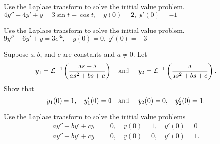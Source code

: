 \documentclass{ximera}
\begin{document}
\begin{problem}\label{exer:8.3.36} Use the Laplace transform to solve the initial value problem. $4y''+4y'+y=3\sin t+\cos t, \quad   y(0)=2,\;  y'(0)=-1$
\end{problem}

\begin{problem}\label{exer:8.3.37} Use the Laplace transform to solve the initial value problem. $9y''+6y'+y=3e^{3t}, \quad   y(0)=0,\;  y'(0)=-3$
\end{problem}

\begin{problem}\label{exer:8.3.38}
Suppose $a,b$, and $c$ are constants and $a\ne0$.  Let
$$
y_1={\cal L}^{-1}\left(as+b\over as^2+bs+c\right)\mbox{\quad and \quad}
y_2={\cal L}^{-1}\left(a\over as^2+bs+c\right).
$$
Show that
$$
y_1(0)=1,\quad y_1'(0)=0\mbox{\quad and \quad} y_2(0)=0,\quad y_2'(0)=1.
$$
\begin{hint}
Use the Laplace transform to solve the initial value
problems
\begin{eqnarray*}
ay''+by'+cy&=&0, \quad   y(0)=1,\quad y'(0)=0 \\
ay''+by'+cy&=&0, \quad  y(0)=0,\quad y'(0)=1.
\end{eqnarray*}
\end{hint}
\end{problem}
\end{document}
